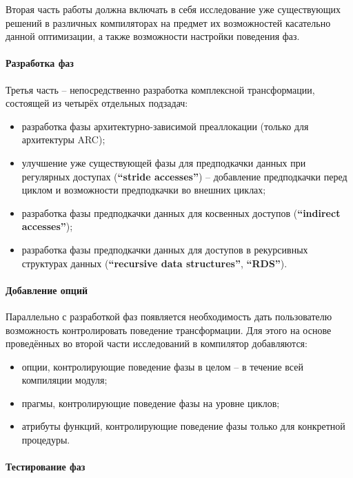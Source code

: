 \documentclass[12pt,a4paper]{article}
\begin{document}
Вторая часть работы должна включать в себя исследование уже существующих решений в различных компиляторах на предмет их возможностей касательно данной оптимизации, а также возможности настройки поведения фаз.

\paragraph{Разработка фаз}

Третья часть -- непосредственно разработка комплексной трансформации, состоящей из четырёх отдельных подзадач:
\begin{itemize}
\item разработка фазы архитектурно-зависимой преаллокации (только для архитектуры ARC);
\item улучшение уже существующей фазы для предподкачки данных при регулярных доступах (\textbf{``stride accesses''}) -- добавление предподкачки перед циклом и возможности предподкачки во внешних циклах;
\item разработка фазы предподкачки данных для косвенных доступов (\textbf{``indirect accesses''});
\item разработка фазы предподкачки данных для доступов в рекурсивных структурах данных (\textbf{``recursive data structures''}, \textbf{``RDS''}).
\end{itemize}

\paragraph{Добавление опций}

Параллельно с разработкой фаз появляется необходимость дать пользователю возможность контролировать поведение трансформации. Для этого на основе проведённых во второй части исследований в компилятор добавляются:

\begin{itemize}
\item опции, контролирующие поведение фазы в целом -- в течение всей компиляции модуля;
\item прагмы, контролирующие поведение фазы на уровне циклов;
\item атрибуты функций, контролирующие поведение фазы только для конкретной процедуры.
\end{itemize}

\paragraph{Тестирование фаз}
\end{document}
